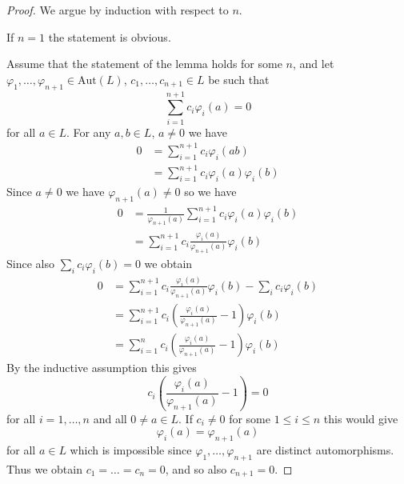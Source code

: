 \documentclass[12pt, letterpaper, oneside]{article}
\theoremstyle{plain}
\theoremstyle{definition}
\newcommand{\Aut}{\mathrm{Aut}}
\newcommand{\vs}{\vskip 5mm}
\begin{document}
\begin{proof}
We argue by induction with respect to $n$. 

If $n=1$ the statement is obvious. 

Assume that the statement of the lemma holds for some $n$, and  
let $\varphi_{1}, \dots, \varphi_{n+1}\in \Aut(L)$, $c_{1}, \dots, c_{n+1}\in L$
be such that 
$$\sum_{i=1}^{n+1}c_{i}\varphi_{i}(a) = 0$$
for all $a\in L$. For any $a, b\in L$, $a\neq 0$ we have 
\begin{align*}
0  &  = \sum_{i=1}^{n+1}c_{i}\varphi_{i}(ab) \\
& =  \sum_{i=1}^{n+1}c_{i}\varphi_{i}(a)\varphi_{i}(b) 
\end{align*}
Since $a\neq 0$ we have $\varphi_{n+1}(a) \neq 0$ so we have 
\begin{align*}
0 & =  \frac{1}{\varphi_{n+1}(a)}\sum_{i=1}^{n+1}c_{i}\varphi_{i}(a)\varphi_{i}(b) \\
& = \sum_{i=1}^{n+1}c_{i}\frac{\varphi_{i}(a)}{\varphi_{n+1}(a)}\varphi_{i}(b)
\end{align*}
Since also $\sum_{i} c_{i}\varphi_{i}(b)=0$ we obtain
\begin{align*}
0 & = \sum_{i=1}^{n+1}c_{i}\frac{\varphi_{i}(a)}{\varphi_{n+1}(a)}\varphi_{i}(b) - \sum_{i} c_{i}\varphi_{i}(b) \\
& = \sum_{i=1}^{n+1}c_{i}\left(\frac{\varphi_{i}(a)}{\varphi_{n+1}(a)}-1\right)\varphi_{i}(b) \\
& =  \sum_{i=1}^{n}c_{i}\left(\frac{\varphi_{i}(a)}{\varphi_{n+1}(a)}-1\right)\varphi_{i}(b)
\end{align*}
By the inductive assumption this gives 
$$c_{i}\left(\frac{\varphi_{i}(a)}{\varphi_{n+1}(a)}-1\right)=0$$
for all $i=1, \dots, n$ and all $0\neq a\in L$. If $c_{i}\neq 0$ for some $1\leq i\leq n$ this would give 
$$\varphi_{i}(a)= \varphi_{n+1}(a)$$
for all $a\in L$ which is impossible since $\varphi_{1}, \dots, \varphi_{n+1}$ are distinct automorphisms. 
Thus we obtain $c_{1}= {\dots} = c_{n} =0$, and so also $c_{n+1} = 0$.  
\end{proof}


\vs\vs
\end{document}
